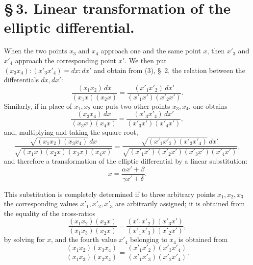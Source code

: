 \documentclass[11pt]{article}
\begin{document}
\section*{\S\,3. Linear transformation of the elliptic differential.}

When the two points $x_3$ and $x_4$ approach one and the same point $x$, then $x'_3$ and $x'_4$ approach the corresponding point $x'$. We then put $(x_3x_4):(x'_3x'_4)=dx:dx'$ and obtain from (3), \S~2, the relation between the differentials $dx,dx'$:
\begin{equation}
\frac{(x_1x_2)\,dx}{(x_1x)(x_2x)}=\frac{(x'_1x'_2)\,dx'}{(x'_1x')(x'_2x')}.
\tag{1}
\end{equation}
Similarly, if in place of $x_1,x_2$ one puts two other points $x_3,x_4$, one obtains
\begin{equation}
\frac{(x_3x_4)\,dx}{(x_3x)(x_4x)}=\frac{(x'_3x'_4)\,dx'}{(x'_3x')(x'_4x')},
\tag{2}
\end{equation}
and, multiplying and taking the square root,
\begin{equation}
\frac{\sqrt{(x_1x_2)(x_3x_4)}\,dx}{\sqrt{(x_1x)(x_2x)(x_3x)(x_4x)}}=
\frac{\sqrt{(x'_1x'_2)(x'_3x'_4)}\,dx'}{\sqrt{(x'_1x')(x'_2x')(x'_3x')(x'_4x')}} ,
\tag{3}
\end{equation}
and therefore a transformation of the elliptic differential by a linear substitution:
\[
x=\frac{\alpha x'+\beta}{\gamma x'+\delta}.
\]

This substitution is completely determined if to three arbitrary points $x_1,x_2,x_3$ the corresponding values $x'_1,x'_2,x'_3$ are arbitrarily assigned; it is obtained from the equality of the cross-ratios
\begin{equation}
\frac{(x_1x_2)(x_3x)}{(x_1x_3)(x_2x)}=\frac{(x'_1x'_2)(x'_3x')}{(x'_1x'_3)(x'_2x')},
\tag{4}
\end{equation}
by solving for $x$, and the fourth value $x'_4$ belonging to $x_4$ is obtained from
\begin{equation}
\frac{(x_1x_2)(x_3x_4)}{(x_1x_3)(x_2x_4)}=\frac{(x'_1x'_2)(x'_3x'_4)}{(x'_1x'_3)(x'_2x'_4)}.
\tag{5}
\end{equation}
\end{document}
